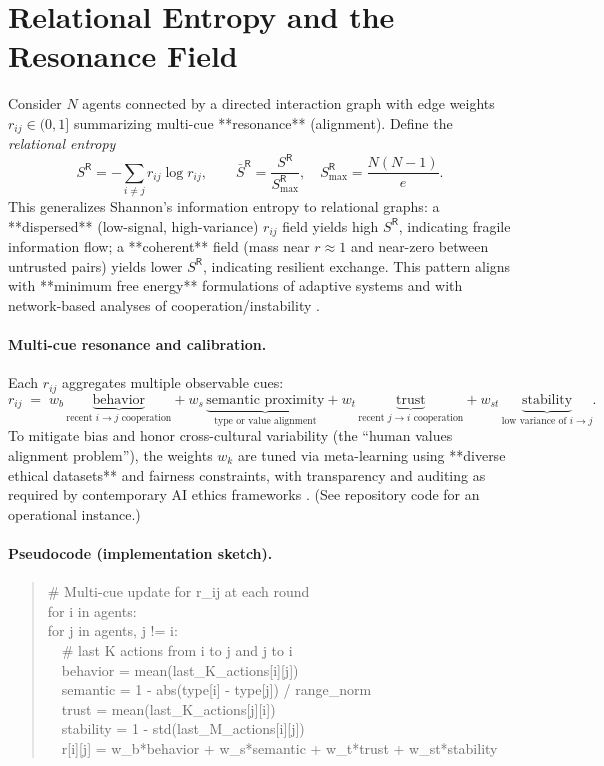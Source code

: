 \documentclass[11pt,a4paper]{article}
\begin{document}
\section{Relational Entropy and the Resonance Field}\label{sec:entropy}
Consider $N$ agents connected by a directed interaction graph with edge weights $r_{ij}\in(0,1]$ summarizing multi-cue **resonance** (alignment). Define the \emph{relational entropy}
\begin{equation}
S^{\mathsf{R}} = - \sum_{i\neq j} r_{ij}\log r_{ij}, \qquad 
\bar S^{\mathsf{R}} = \frac{S^{\mathsf{R}}}{S^{\mathsf{R}}_{\max}}, \quad S^{\mathsf{R}}_{\max}=\frac{N(N-1)}{e}.
\end{equation}
This generalizes Shannon’s information entropy to relational graphs: a **dispersed** (low-signal, high-variance) $r_{ij}$ field yields high $S^{\mathsf{R}}$, indicating fragile information flow; a **coherent** field (mass near $r\!\approx\!1$ and near-zero between untrusted pairs) yields lower $S^{\mathsf{R}}$, indicating resilient exchange. This pattern aligns with **minimum free energy** formulations of adaptive systems \cite{Friston2010} and with network-based analyses of cooperation/instability \cite{HauertSzabo2005}.

\paragraph{Multi-cue resonance and calibration.} Each $r_{ij}$ aggregates multiple observable cues:
\[
r_{ij}\;=\; w_b\,\underbrace{\text{behavior}}_{\text{recent $i\to j$ cooperation}}
+ w_s\,\underbrace{\text{semantic proximity}}_{\text{type or value alignment}}
+ w_t\,\underbrace{\text{trust}}_{\text{recent $j\to i$ cooperation}} 
+ w_{st}\,\underbrace{\text{stability}}_{\text{low variance of $i\to j$}}.
\]
To mitigate bias and honor cross-cultural variability (the “human values alignment problem”), the weights \(w_k\) are tuned via meta-learning using **diverse ethical datasets** and fairness constraints, with transparency and auditing as required by contemporary AI ethics frameworks \cite{Floridi2020,Russell2019}. (See repository code for an operational instance.)

\paragraph{Pseudocode (implementation sketch).}
\begin{quote}\small\ttfamily
\# Multi-cue update for r\_ij at each round\\
for i in agents:\\
\quad for j in agents, j != i:\\
\quad\ \ \# last K actions from i to j and j to i\\
\quad\ \ behavior = mean(last\_K\_actions[i][j])\\
\quad\ \ semantic = 1 - abs(type[i] - type[j]) / range\_norm\\
\quad\ \ trust = mean(last\_K\_actions[j][i])\\
\quad\ \ stability = 1 - std(last\_M\_actions[i][j])\\
\quad\ \ r[i][j] = w\_b*behavior + w\_s*semantic + w\_t*trust + w\_st*stability
\end{quote}
\end{document}
